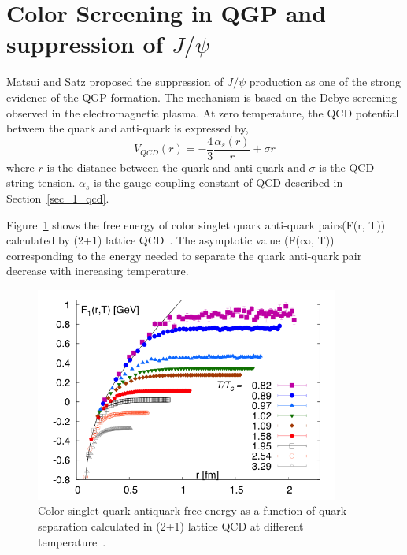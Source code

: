 \section{Color Screening in QGP and suppression of $J/\psi$}
\label{sec_2_screening}
Matsui and Satz proposed the suppression of $J/\psi$ production as one of the strong evidence of the QGP formation\cite{bib_matsui}. 
The mechanism is based on the Debye screening observed in the electromagnetic plasma. 
At zero temperature, the QCD potential between the quark and anti-quark is expressed by, 
\begin{equation}
V_{QCD}(r) = -\frac{4}{3}\frac{\alpha_{s}(r)}{r}+\sigma r
\label{eq_2_jpsiv}
\end{equation}
where $r$ is the distance between the quark and anti-quark and $\sigma$ is the QCD string tension. 
$\alpha_{s}$ is the gauge coupling constant of QCD described in Section~\ref{sec_1_qcd}. 

Figure~\ref{fig_2_freeenergy} shows the free energy of color singlet quark anti-quark pairs(F(r, T)) calculated by (2+1) lattice QCD~\cite{bib_jpsimodel}.  
The asymptotic value (F($\infty$, T)) corresponding to the energy needed to separate the quark anti-quark pair decrease with increasing temperature. 
\begin{figure}[!h]
  \centering
  \includegraphics[width=10cm]{chap2/figure/Suppression/FreeEnergy.png}
  \caption{Color singlet quark-antiquark free energy as a function of quark separation calculated in (2+1) lattice QCD at different temperature~\cite{bib_jpsimodel}.}
  \label{fig_2_freeenergy}
\end{figure}


